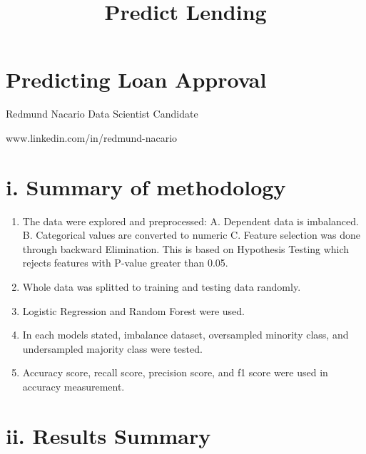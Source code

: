 \documentclass[11pt]{article}
\title{Predict Lending}
\providecommand{\tightlist}{%
      \setlength{\itemsep}{0pt}\setlength{\parskip}{0pt}}
\begin{document}
    
    
    \maketitle
    
    

    
    \hypertarget{predicting-loan-approval}{%
\section{Predicting Loan Approval}\label{predicting-loan-approval}}

    Redmund Nacario Data Scientist Candidate

www.linkedin.com/in/redmund-nacario

    \hypertarget{i.-summary-of-methodology}{%
\section{i. Summary of methodology}\label{i.-summary-of-methodology}}

    \begin{enumerate}
\def\labelenumi{\arabic{enumi}.}
\tightlist
\item
  The data were explored and preprocessed: A. Dependent data is
  imbalanced. B. Categorical values are converted to numeric C. Feature
  selection was done through backward Elimination. This is based on
  Hypothesis Testing which rejects features with P-value greater than
  0.05. 
\item
  Whole data was splitted to training and testing data randomly. 
\item
  Logistic Regression and Random Forest were used. 
\item
  In each models stated, imbalance dataset, oversampled minority class,
  and undersampled majority class were tested. 
\item
  Accuracy score, recall score, precision score, and f1 score were used
  in accuracy measurement.
\end{enumerate}

    \hypertarget{ii.-results-summary}{%
\section{ii. Results Summary}\label{ii.-results-summary}}
\end{document}
